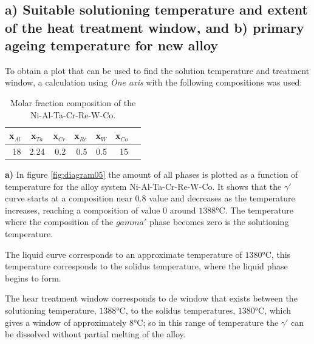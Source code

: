 \section{}

\subsection{a) Suitable solutioning temperature and extent of the heat treatment window, and b) primary ageing temperature for new alloy}

To obtain a plot that can be used to find the solution temperature and treatment window, a calculation using \textit{One axis} with the following compositions was used:

\begin{table}[h]
  \centering
  \begin{tabular}{rrrrrrr}
    \multicolumn{1}{c}{x$_{Al}$} & \multicolumn{1}{c}{x$_{Ta}$} & \multicolumn{1}{c}{x$_{Cr}$} & \multicolumn{1}{c}{x$_{Re}$} & \multicolumn{1}{c}{x$_{W}$} & \multicolumn{1}{c}{x$_{Co}$} \\ \hline \hline
    18 & 2.24 & 0.2 & 0.5 & 0.5 & 15
  \end{tabular}
  \caption{Molar fraction composition of the Ni-Al-Ta-Cr-Re-W-Co.}
  \label{tab:tab10}
\end{table}

\textbf{a)} In  figure \ref{fig:diagram05} the amount of all phases is plotted as a function of temperature for the alloy system Ni-Al-Ta-Cr-Re-W-Co. It shows that the $\gamma'$ curve starts at a composition near $0.8$ value and decreases as the temperature increases, reaching a composition of value $0$ around $1388$°C. The temperature where the composition of the $gamma'$ phase becomes zero is the solutioning temperature. 

The liquid curve corresponds to an approximate temperature of $1380$°C, this temperature corresponds to the solidus temperature, where the liquid phase begins to form. 

The hear treatment window corresponds to de window that exists between the solutioning temperature, $1388$°C, to the solidus temperatures, $1380$°C, which gives a window of approximately $8$°C; so in this range of temperature the $\gamma'$ can be dissolved without partial melting of the alloy.

